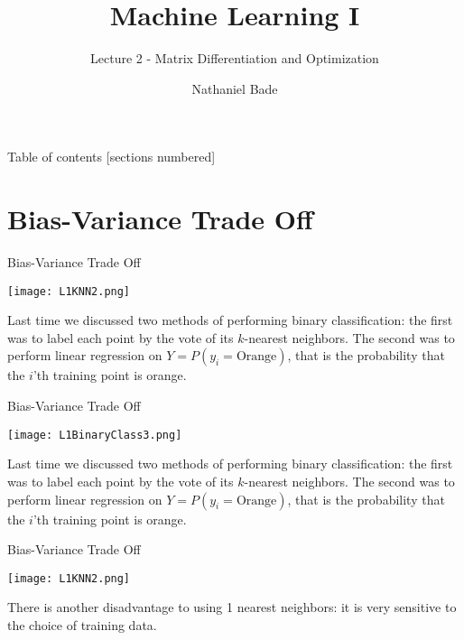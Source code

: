 \documentclass[10pt,handout]{beamer}
\title{Machine Learning I}
\subtitle{Lecture 2 - Matrix Differentiation and Optimization}
\date{}
\author{Nathaniel Bade}
\institute{Northeastern University Department of Mathematics}
\begin{document}
\maketitle

\begin{frame}{Table of contents}
  [sections numbered]
  \tableofcontents[hideallsubsections]
\end{frame}





\section{Bias-Variance Trade Off}


\begin{frame}[fragile]{Bias-Variance Trade Off}
  \begin{minipage}[t][0.5\textheight][t]{\textwidth}
    \centering
     \texttt{[image: L1KNN2.png]}
  \end{minipage}
  \vfill
  \begin{minipage}[t][0.5\textheight][t]{\textwidth}
Last time we discussed two methods of performing binary classification: the first was to label each point by the vote of its $k$-nearest neighbors. The second was to perform linear regression on $Y = P(y_i = \text{Orange})$, that is the probability that the $i$'th training point is orange. 
 \end{minipage}
\end{frame}


\begin{frame}[fragile]{Bias-Variance Trade Off}
  \begin{minipage}[t][0.5\textheight][t]{\textwidth}
    \centering
     \texttt{[image: L1BinaryClass3.png]}
  \end{minipage}
  \vfill
  \begin{minipage}[t][0.5\textheight][t]{\textwidth}
Last time we discussed two methods of performing binary classification: the first was to label each point by the vote of its $k$-nearest neighbors. The second was to perform linear regression on $Y = P(y_i = \text{Orange})$, that is the probability that the $i$'th training point is orange. 
 \end{minipage}
\end{frame}




\begin{frame}[fragile]{Bias-Variance Trade Off}
  \begin{minipage}[t][0.5\textheight][t]{\textwidth}
    \centering
     \texttt{[image: L1KNN2.png]}
  \end{minipage}
  \vfill
  \begin{minipage}[t][0.5\textheight][t]{\textwidth}
There is another disadvantage to using 1 nearest neighbors: it is very sensitive to the choice of training data.
 \end{minipage}
\end{frame}
\end{document}
